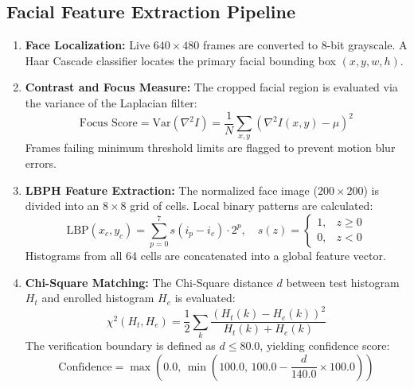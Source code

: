 \documentclass[11pt,a4paper]{article}
\begin{document}
\subsection{Facial Feature Extraction Pipeline}
\begin{enumerate}
    \item \textbf{Face Localization:} Live $640 \times 480$ frames are converted to 8-bit grayscale. A Haar Cascade classifier locates the primary facial bounding box $(x, y, w, h)$.
    \item \textbf{Contrast and Focus Measure:} The cropped facial region is evaluated via the variance of the Laplacian filter:
    \begin{equation}
    \text{Focus Score} = \text{Var}\left( \nabla^2 I \right) = \frac{1}{N} \sum_{x,y} \left( \nabla^2 I(x, y) - \mu \right)^2
    \label{eq:focus}
    \end{equation}
    Frames failing minimum threshold limits are flagged to prevent motion blur errors.
    \item \textbf{LBPH Feature Extraction:} The normalized face image ($200 \times 200$) is divided into an $8 \times 8$ grid of cells. Local binary patterns are calculated:
    \begin{equation}
    \text{LBP}(x_c, y_c) = \sum_{p=0}^{7} s(i_p - i_c) \cdot 2^p, \quad s(z) = \begin{cases} 1, & z \ge 0 \\ 0, & z < 0 \end{cases}
    \label{eq:lbp}
    \end{equation}
    Histograms from all 64 cells are concatenated into a global feature vector.
    \item \textbf{Chi-Square Matching:} The Chi-Square distance $d$ between test histogram $H_t$ and enrolled histogram $H_e$ is evaluated:
    \begin{equation}
    \chi^2(H_t, H_e) = \frac{1}{2} \sum_{k} \frac{\left( H_t(k) - H_e(k) \right)^2}{H_t(k) + H_e(k)}
    \label{eq:chi}
    \end{equation}
    The verification boundary is defined as $d \le 80.0$, yielding confidence score:
    \begin{equation}
    \text{Confidence} = \max\left( 0.0, \, \min\left( 100.0, \, 100.0 - \frac{d}{140.0} \times 100.0 \right) \right)
    \end{equation}
\end{enumerate}
\end{document}
